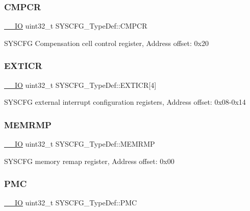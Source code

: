 \subsubsection{\texorpdfstring{CMPCR}{CMPCR}}
{\footnotesize\ttfamily \mbox{\hyperlink{core__sc300_8h_aec43007d9998a0a0e01faede4133d6be}{\+\_\+\+\_\+\+IO}} uint32\+\_\+t S\+Y\+S\+C\+F\+G\+\_\+\+Type\+Def\+::\+C\+M\+P\+CR}

S\+Y\+S\+C\+FG Compensation cell control register, Address offset\+: 0x20 \mbox{\label{struct_s_y_s_c_f_g___type_def_a66a06b3aab7ff5c8fa342f7c1994bf7d}} 
\subsubsection{\texorpdfstring{EXTICR}{EXTICR}}
{\footnotesize\ttfamily \mbox{\hyperlink{core__sc300_8h_aec43007d9998a0a0e01faede4133d6be}{\+\_\+\+\_\+\+IO}} uint32\+\_\+t S\+Y\+S\+C\+F\+G\+\_\+\+Type\+Def\+::\+E\+X\+T\+I\+CR\mbox{[}4\mbox{]}}

S\+Y\+S\+C\+FG external interrupt configuration registers, Address offset\+: 0x08-\/0x14 \mbox{\label{struct_s_y_s_c_f_g___type_def_a85b9d3df2274b730327b181c402a7bf5}} 
\subsubsection{\texorpdfstring{MEMRMP}{MEMRMP}}
{\footnotesize\ttfamily \mbox{\hyperlink{core__sc300_8h_aec43007d9998a0a0e01faede4133d6be}{\+\_\+\+\_\+\+IO}} uint32\+\_\+t S\+Y\+S\+C\+F\+G\+\_\+\+Type\+Def\+::\+M\+E\+M\+R\+MP}

S\+Y\+S\+C\+FG memory remap register, Address offset\+: 0x00 \mbox{\label{struct_s_y_s_c_f_g___type_def_ab5c47c570566cb8ff9d0436c17cc9241}} 
\subsubsection{\texorpdfstring{PMC}{PMC}}
{\footnotesize\ttfamily \mbox{\hyperlink{core__sc300_8h_aec43007d9998a0a0e01faede4133d6be}{\+\_\+\+\_\+\+IO}} uint32\+\_\+t S\+Y\+S\+C\+F\+G\+\_\+\+Type\+Def\+::\+P\+MC}

